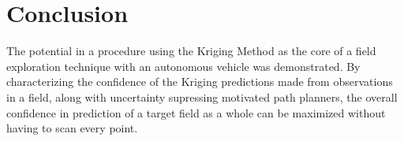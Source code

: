 \chapter{Conclusion}
The potential in a procedure using the Kriging Method as the core of a field exploration technique with an autonomous vehicle was demonstrated. By characterizing the confidence of the Kriging predictions made from observations in a field, along with uncertainty supressing motivated path planners, the overall confidence in prediction of a target field as a whole can be maximized without having to scan every point.